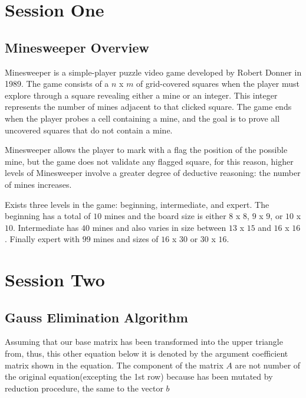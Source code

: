 \documentclass[a4paper]{article}
\numberwithin{equation}{subsection}
\begin{document}
\section{Session One} \label{chap:1}

\subsection{Minesweeper Overview}
Minesweeper is a simple-player puzzle video game developed by Robert Donner in 1989. The game consists of a $n$ x $m$ of grid-covered squares when the player must explore through a square revealing either a mine or an integer. This integer represents the number of mines adjacent to that clicked square. The game ends when the player probes a cell containing a mine, and the goal is to prove all uncovered squares that do not contain a mine.



\vspace{5mm} %
Minesweeper allows the player to mark with a flag the position of the possible mine, but the game does not validate any flagged square, for this reason, higher levels of Minesweeper involve a greater degree of deductive reasoning: the number of mines increases. 


\vspace{5mm} %
Exists three levels in the game: beginning, intermediate, and expert. The beginning has a total of $10$ mines and the board size is either $8$ x $8$, $9$ x $9$, or $10$ x $10$. Intermediate has $40$ mines and also varies in size between $13$ x $15$ and $16$ x $16$. Finally expert with $99$ mines and sizes of $16$ x $30$ or $30$ x $16$.
\section{Session Two } \label{chap:2}
\subsection{Gauss Elimination Algorithm}
Assuming that our base matrix has been transformed into the upper triangle from, thus, this other equation below it is denoted by the argument coefficient matrix shown in the equation. The component of the matrix $A$ are not number of the original equation(excepting the 1st row) because has been mutated by reduction procedure, the same to the vector $b$
\end{document}
